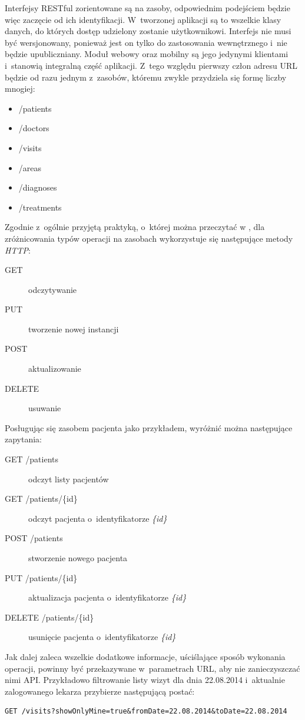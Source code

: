 \documentclass[11pt]{aghdpl}
\begin{document}
Interfejsy RESTful zorientowane są na zasoby, odpowiednim podejściem będzie więc zaczęcie od ich identyfikacji. W~tworzonej aplikacji są to wszelkie klasy danych, do których dostęp udzielony zostanie użytkownikowi. Interfejs nie musi być wersjonowany, ponieważ jest on tylko do zastosowania wewnętrznego i~nie będzie upubliczniany. Moduł webowy oraz mobilny są jego jedynymi klientami i~stanowią integralną część aplikacji. Z~tego względu pierwszy człon adresu URL będzie od razu jednym z~zasobów, któremu zwykle przydziela się formę liczby mnogiej:
\begin{itemize}
	\item /patients
	\item /doctors
	\item /visits
	\item /areas
	\item /diagnoses
	\item /treatments
\end{itemize}

Zgodnie z~ogólnie przyjętą praktyką, o~której można przeczytać w \cite{WApiD}, dla zróżnicowania typów operacji na zasobach wykorzystuje się następujące metody \emph{HTTP}:
\begin{description}
	\item[GET] odczytywanie
	\item[PUT] tworzenie nowej instancji
	\item[POST] aktualizowanie
	\item[DELETE] usuwanie
\end{description}

Posługując się zasobem pacjenta jako przykładem, wyróżnić można następujące zapytania:
\begin{description}
\item[GET /patients] odczyt listy pacjentów
\item[GET /patients/\{id\}] odczyt pacjenta o~identyfikatorze \emph{\{id\}}
\item[POST /patients] stworzenie nowego pacjenta
\item[PUT /patients/\{id\}] aktualizacja pacjenta o~identyfikatorze \emph{\{id\}}
\item[DELETE /patients/\{id\}] usunięcie pacjenta o~identyfikatorze \emph{\{id\}}
\end{description}

Jak dalej zaleca \cite{WApiD} wszelkie dodatkowe informacje, uściślające sposób wykonania operacji, powinny być przekazywane w~parametrach URL, aby nie zanieczyszczać nimi API. Przykładowo filtrowanie listy wizyt dla dnia 22.08.2014 i~aktualnie zalogowanego lekarza przybierze następującą postać:
\begin{lstlisting}
GET /visits?showOnlyMine=true&fromDate=22.08.2014&toDate=22.08.2014
\end{lstlisting}
\end{document}
